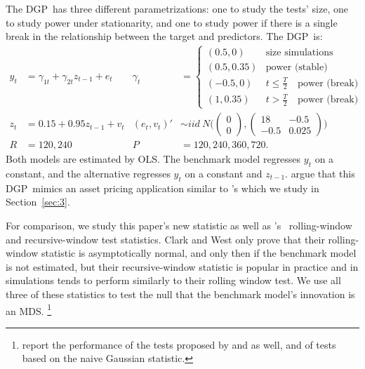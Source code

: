 \documentclass[12pt,fleqn]{article}
\newcommand\citepos[2][]{\citeauthor{#2}'s \citeyearpar[#1]{#2}}
\newcommand\poscw{\citeauthor{ClW:06}'s \citeyearpar{ClW:06,ClW:07}}
\providecommand\testsize{[missing]}
\providecommand\totalsims{[missing]}
\theoremstyle{definition}
\newcommand{\dgp}{DGP}
\newcommand{\mds}{MDS}
\newcommand{\ols}{OLS}
\newcommand{\oos}{OOS}
\begin{document}
The \dgp\ has three different parametrizations: one to study the
tests' size, one to study power under stationarity, and one to study
power if there is a single break in the relationship between the
target and predictors.  The \dgp\ is:
\begin{align*}
  y_t &= \gamma_{1t} + \gamma_{2t} z_{t-1} + e_t &
  \gamma_t &=
  \begin{cases}
    (0.5, 0)    & \text{size simulations} \\
    (0.5, 0.35) & \text{power (stable)} \\
    (-0.5, 0)    & t \leq \tfrac{T}{2} \quad \text{power (break)} \\
    (1, 0.35) & t > \tfrac{T}{2} \quad \text{power (break)}
  \end{cases}\\\nonumber
  z_t &= 0.15 + 0.95 z_{t-1} + v_t &
  (e_t, v_t)' &\sim iid\ N\Bigg(\begin{pmatrix} 0 \\ 0
  \end{pmatrix}
   , \begin{pmatrix} 18 & -
    0.5 \\ -0.5 & 0.025 \end{pmatrix}\Bigg)
  \\ R &= 120, 240 & P &= 120, 240, 360, 720.
\end{align*}
Both models are estimated by \ols. The benchmark model regresses $y_t$
on a constant, and the alternative regresses $y_t$ on a constant and
$z_{t-1}$.  \citet{ClW:07} argue that this \dgp\ mimics an asset
pricing application similar to \citepos{GoW:08} which we study in
Section~\ref{sec:3}.

For comparison, we study this paper's new statistic as well as \poscw\
rolling-window and recursive-window test statistics.  Clark and West
only prove that their rolling-window statistic is asymptotically
normal, and only then if the benchmark model is not estimated, but
their recursive-window statistic is popular in practice and in
simulations tends to perform similarly to their rolling window test.
We use all three of these statistics to test the null that the
benchmark model's innovation is an \mds.%
\footnote{\citet{ClW:07}
  report the performance of the tests proposed by \citet{CCS:01} and
  \citet{ClM:05} as well, and of tests based on the naive Gaussian
  statistic.} %

\begin{table}[tb]
  \centering
  
  \caption{Size and power of the \oos\ tests in the simulations 
    described by Section~\ref{sec:2}, at
    \testsize\% confidence.  These percentages are calculated from \totalsims\
    samples.  Pr[\textsc{cw} roll.] shows the fraction of simulations for
    which Clark and West's (2007) rolling-window statistic rejects; 
    Pr[\textsc{cw} rec.] shows the fraction of simulations for which 
    their recursive-window statistic rejects; and Pr[new] shows the fraction of
    simulations for which this paper's test rejects.}
\label{tab:mc1}
\end{table}
\end{document}
